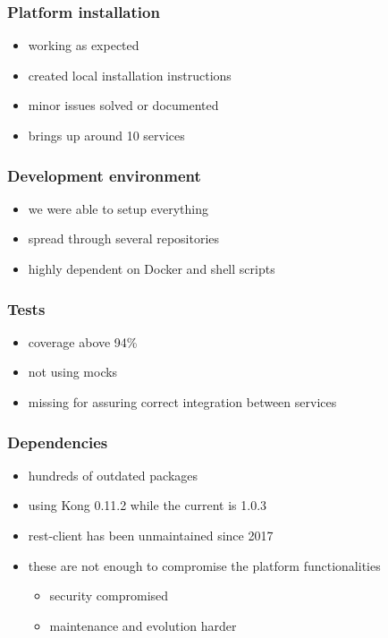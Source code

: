 \documentclass{beamer}
\begin{document}
  \begin{frame}
    \frametitle{Platform installation}

    \begin{itemize}
      \item working as expected
      \item created local installation instructions
      \item minor issues solved or documented
      \item brings up around 10 services
    \end{itemize}
  \end{frame}

  \begin{frame}
    \frametitle{Development environment}

    \begin{itemize}
      \item we were able to setup everything
      \item spread through several repositories
      \item highly dependent on Docker and shell scripts
    \end{itemize}
  \end{frame}

  \begin{frame}
    \frametitle{Tests}

    \begin{itemize}
      \item coverage above 94\%
      \item not using mocks
      \item missing for assuring correct integration between services
    \end{itemize}
  \end{frame}

  \begin{frame}
    \frametitle{Dependencies}

    \begin{itemize}
      \item hundreds of outdated packages
      \item using Kong 0.11.2 while the current is 1.0.3
      \item rest-client has been unmaintained since 2017
      \item these are not enough to compromise the platform functionalities
        \begin{itemize}
          \item security compromised
          \item maintenance and evolution harder
        \end{itemize}
    \end{itemize}
  \end{frame}
\end{document}
